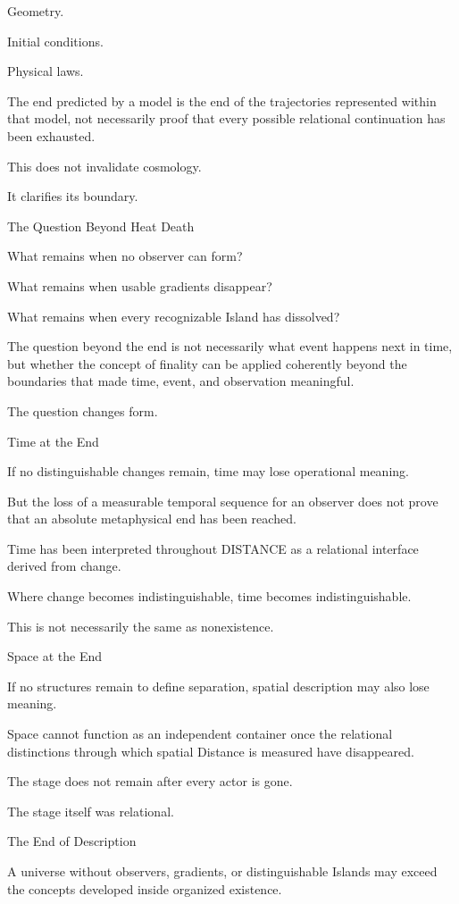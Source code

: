 Geometry.

Initial conditions.

Physical laws.

The end predicted by a model is the end of the trajectories represented within that model, not necessarily proof that every possible relational continuation has been exhausted.

This does not invalidate cosmology.

It clarifies its boundary.

The Question Beyond Heat Death

What remains when no observer can form?

What remains when usable gradients disappear?

What remains when every recognizable Island has dissolved?

The question beyond the end is not necessarily what event happens next in time, but whether the concept of finality can be applied coherently beyond the boundaries that made time, event, and observation meaningful.

The question changes form.

Time at the End

If no distinguishable changes remain, time may lose operational meaning.

But the loss of a measurable temporal sequence for an observer does not prove that an absolute metaphysical end has been reached.

Time has been interpreted throughout DISTANCE as a relational interface derived from change.

Where change becomes indistinguishable, time becomes indistinguishable.

This is not necessarily the same as nonexistence.

Space at the End

If no structures remain to define separation, spatial description may also lose meaning.

Space cannot function as an independent container once the relational distinctions through which spatial Distance is measured have disappeared.

The stage does not remain after every actor is gone.

The stage itself was relational.

The End of Description

A universe without observers, gradients, or distinguishable Islands may exceed the concepts developed inside organized existence.


